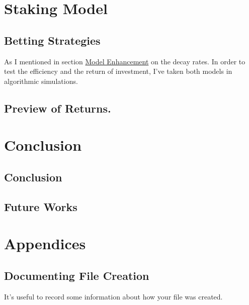 \documentclass[article]{jss}
\begin{document}
\section{Staking Model}\label{staking-model}

\subsection{Betting Strategies}\label{betting-strategies}

As I mentioned in section \protect\hyperlink{model-enhancement}{Model
Enhancement} on the decay rates. In order to test the efficiency and the
return of investment, I've taken both models in algorithmic simulations.

\subsection{Preview of Returns.}\label{preview-of-returns.}

\section{Conclusion}\label{conclusion}

\subsection{Conclusion}\label{conclusion-1}

\subsection{Future Works}\label{future-works}

\section{Appendices}\label{appendices}

\subsection{Documenting File Creation}\label{documenting-file-creation}

It's useful to record some information about how your file was created.
\end{document}
